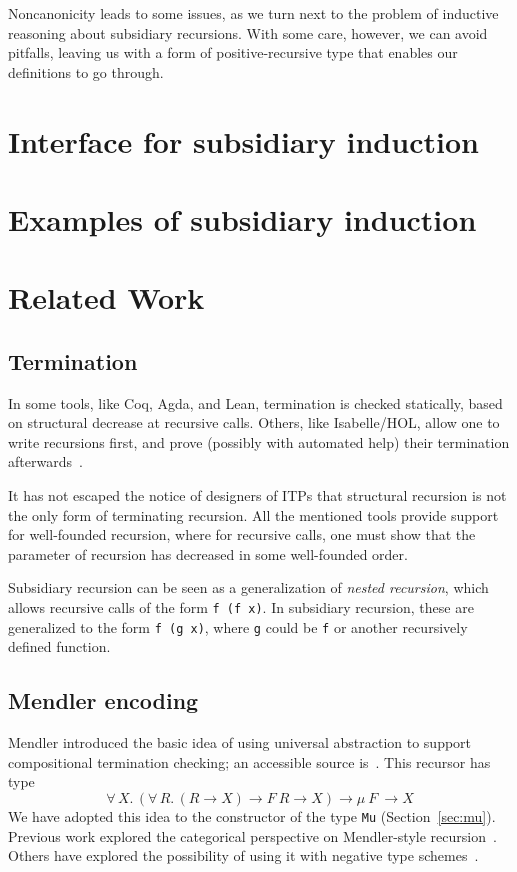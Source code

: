 \documentclass[a4paper,USenglish]{lipics-v2021}
\newcommand{\all}[2]{\forall\, #1.\, #2}
\begin{document}
Noncanonicity leads to some issues, as we turn next to the problem of
inductive reasoning about subsidiary recursions.  With some care,
however, we can avoid pitfalls, leaving us with a form of
positive-recursive type that enables our definitions to go through.

\section{Interface for subsidiary induction}
\label{sec:interfacei}

\section{Examples of subsidiary induction}
\label{sec:examplesi}

\section{Related Work}
\label{sec:related}

\subsection{Termination}
In some tools, like Coq, Agda, and Lean, termination is checked
statically, based on structural decrease at recursive calls.  Others,
like Isabelle/HOL, allow one to write recursions first, and prove
(possibly with automated help) their termination
afterwards~\cite{krauss}.

It has not escaped the notice of designers of ITPs that structural
recursion is not the only form of terminating recursion.  All the
mentioned tools provide support for well-founded recursion, where for
recursive calls, one must show that the parameter of recursion has
decreased in some well-founded order.

Subsidiary recursion can be seen as a generalization of \emph{nested
recursion}, which allows recursive calls of the form \verb|f (f x)|.
In subsidiary recursion, these are generalized to the form
\verb|f (g x)|, where \verb|g| could be \verb|f| or another
recursively defined function.

\subsection{Mendler encoding}

Mendler introduced the basic idea of using universal abstraction to
support compositional termination checking; an accessible source
is~\cite{mendler91}.  This recursor has type
\[
\all{X}{(\all{R}{(R \to X) \to F\ R \to X}) \to \mu\ F\ \to X}
\]
\noindent We have adopted this idea to the constructor of the type
\verb|Mu| (Section~\ref{sec:mu}).  Previous work explored the
categorical perspective on Mendler-style recursion~\cite{uustalu99}.
Others have explored the possibility of using it with negative type
schemes~\cite{ahn11}.


\end{document}
